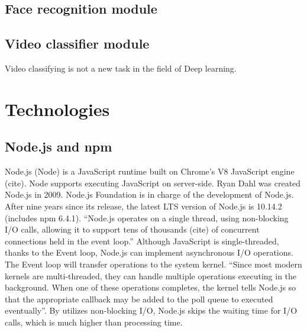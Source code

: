 \subsection{Face recognition module}
\subsection{Video classifier module}
Video classifying is not a new task in the field of Deep learning.
	
\section{Technologies}
\subsection{Node.js and npm}
Node.js (Node) is a JavaScript runtime built on Chrome's V8 JavaScript engine (cite). Node supports executing JavaScript on server-side. Ryan Dahl was created Node.js in 2009. Node.js Foundation is in charge of the development of Node.js. After nine years since its release, the latest LTS version of Node.js is 10.14.2 (includes npm 6.4.1). “Node.js operates on a single thread, using non-blocking I/O calls, allowing it to support tens of thousands (cite) of concurrent connections held in the event loop.” Although JavaScript is single-threaded, thanks to the Event loop, Node.js can implement asynchronous I/O operations. The Event loop will transfer operations to the system kernel. “Since most modern kernels are multi-threaded, they can handle multiple operations executing in the background. When one of these operations completes, the kernel tells Node.js so that the appropriate callback may be added to the poll queue to executed eventually”. By utilizes non-blocking I/O, Node.js skips the waiting time for I/O calls, which is much higher than processing time.